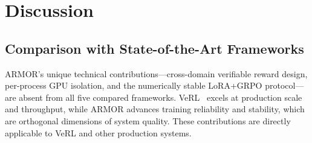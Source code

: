 \documentclass{ieeeaccess}
\begin{document}
\section{Discussion}
\label{sec:discussion}

\subsection{Comparison with State-of-the-Art Frameworks}

\begin{table}[t]
\centering
\caption{ARMOR vs.\ State-of-the-Art RLHF Frameworks}
\label{tab:comparison}
\end{table}

ARMOR's unique technical contributions---cross-domain verifiable reward design,
per-process GPU isolation, and the numerically stable LoRA+GRPO protocol---are absent from all five compared frameworks.
VeRL~\cite{sheng2024hybridflow} excels at production scale and throughput,
while ARMOR advances training reliability and stability,
which are orthogonal dimensions of system quality.
These contributions are directly applicable to VeRL and other production systems.
\end{document}
